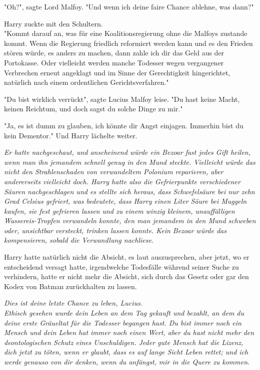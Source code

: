 {"Oh?", sagte Lord Malfoy. "Und wenn ich deine faire Chance ablehne, was dann?"

Harry zuckte mit den Schultern.\\ "Kommt darauf an, was für eine Koalitionsregierung ohne die Malfoys zustande kommt. Wenn die Regierung friedlich reformiert werden kann und es den Frieden stören würde, es anders zu machen, dann zahle ich dir das Geld aus der Portokasse. Oder vielleicht werden manche Todesser wegen vergangener Verbrechen erneut angeklagt und im Sinne der Gerechtigkeit hingerichtet, natürlich nach einem ordentlichen Gerichtsverfahren."

"Du bist wirklich verrückt", sagte Lucius Malfoy leise. "Du hast keine Macht, keinen Reichtum, und doch sagst du solche Dinge zu mir."

"Ja, es ist dumm zu glauben, ich könnte dir Angst einjagen. Immerhin bist du kein Dementor." Und Harry lächelte weiter.

\emph{Er hatte nachgeschaut, und anscheinend würde ein Bezoar fast jedes Gift heilen, wenn man ihn jemandem schnell genug in den Mund steckte. Vielleicht würde das nicht den Strahlenschaden von verwandeltem Polonium reparieren, aber andererseits vielleicht doch. Harry hatte also die Gefrierpunkte verschiedener Säuren nachgeschlagen und es stellte sich heraus, dass Schwefelsäure bei nur zehn Grad Celsius gefriert, was bedeutete, dass Harry einen Liter Säure bei Muggeln kaufen, sie fest gefrieren lassen und zu einem winzig kleinem, unauffälligen Wassereis-Tropfen verwandeln konnte, den man jemandem in den Mund schweben oder, unsichtbar versteckt, trinken lassen konnte. Kein Bezoar würde das kompensieren, sobald die Verwandlung nachliese.}

Harry hatte natürlich nicht die Absicht, es laut auszusprechen, aber jetzt, wo er entscheidend versagt hatte, irgendwelche Todesfälle während seiner Suche zu verhindern, hatte er nicht mehr die Absicht, sich durch das Gesetz oder gar den Kodex von Batman zurückhalten zu lassen.

\emph{Dies ist deine letzte Chance zu leben, Lucius.}\\ \emph{Ethisch gesehen wurde dein Leben an dem Tag gekauft und bezahlt, an dem du deine erste Gräueltat für die Todesser begangen hast. Du bist immer noch ein Mensch und dein Leben hat immer noch einen Wert, aber du hast nicht mehr den deontologischen Schutz eines Unschuldigen. Jeder gute Mensch hat die Lizenz, dich jetzt zu töten, wenn er glaubt, dass es auf lange Sicht Leben rettet; und ich werde genauso von dir denken, wenn du anfängst, mir in die Quere zu kommen.}

}
